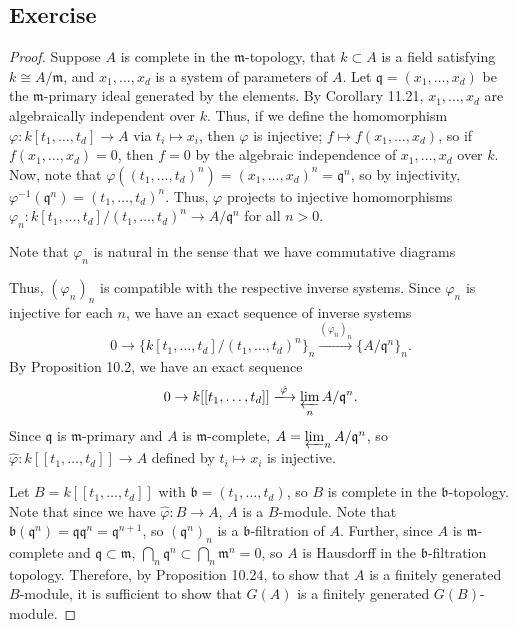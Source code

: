 \subsection{Exercise}\label{11.2}

\begin{proof}
Suppose $A$ is complete in the $\mathfrak{m}$-topology, that $k \subset A$ is a field satisfying $k \cong A/\mathfrak{m}$, and $x_1,\ldots,x_d$
is a system of parameters of $A$. Let $\mathfrak{q} = (x_1,\ldots,x_d)$ be the $\mathfrak{m}$-primary ideal generated by the elements.
By Corollary 11.21, $x_1,\ldots,x_d$ are algebraically independent over $k$. Thus, if we define the homomorphism $\varphi : k[t_1,\ldots,t_d] \to A$
via $t_i \mapsto x_i$, then $\varphi$ is injective; $f \mapsto f(x_1,\ldots,x_d)$, so if $f(x_1,\ldots,x_d) = 0$, then $f = 0$ by the 
algebraic independence of $x_1,\ldots,x_d$ over $k$. Now, note that $\varphi((t_1,\ldots,t_d)^n) = (x_1,\ldots,x_d)^n = \mathfrak{q}^n$, so by injectivity,
$\varphi^{-1}(\mathfrak{q}^n) = (t_1,\ldots,t_d)^n$. Thus, $\varphi$ projects to injective homomorphisms 
$\varphi_n : k[t_1,\ldots,t_d]/(t_1,\ldots,t_d)^n \to A/\mathfrak{q}^n$ for all $n > 0$. 

Note that $\varphi_n$ is natural in the sense that we have commutative diagrams
\begin{center}
\end{center}
Thus, $(\varphi_n)_n$ is compatible with the respective inverse systems. Since $\varphi_n$ is injective for each $n$, we have an exact sequence
of inverse systems
$$0 \to \{k[t_1,\ldots,t_d]/(t_1,\ldots,t_d)^n\}_n \xrightarrow{(\varphi_n)_n} \{A/\mathfrak{q}^n\}_n.$$
By Proposition 10.2, we have an exact sequence
$$0 \to k[[t_1,\ldots,t_d]] \xlongrightarrow{\hat \varphi} \varprojlim_n A/\mathfrak{q}^n.$$
Since $\mathfrak{q}$ is $\mathfrak{m}$-primary and $A$ is $\mathfrak{m}$-complete, $A = \varprojlim_n A/\mathfrak{q}^n$, so $\hat \varphi: k[[t_1,\ldots,t_d]] \to A$
defined by $t_i \mapsto x_i$ is injective.

Let $B = k[[t_1,\ldots,t_d]]$ with $\mathfrak{b} = (t_1,\ldots,t_d)$, so $B$ is complete in the $\mathfrak{b}$-topology. Note that since we have $\hat \varphi : B \to A$,
$A$ is a $B$-module. Note that $\mathfrak{b}(\mathfrak{q}^n) = \mathfrak{q}\mathfrak{q}^n = \mathfrak{q}^{n+1}$, so $(\mathfrak{q}^n)_n$ is a $\mathfrak{b}$-filtration
of $A$. Further, since $A$ is $\mathfrak{m}$-complete and $\mathfrak{q} \subset \mathfrak{m}$, $\bigcap_n \mathfrak{q}^n \subset \bigcap_n \mathfrak{m}^n = 0$,
so $A$ is Hausdorff in the $\mathfrak{b}$-filtration topology. Therefore, by Proposition 10.24, to show that $A$ is a finitely generated $B$-module, it is sufficient
to show that $G(A)$ is a finitely generated $G(B)$-module.


\end{proof}
